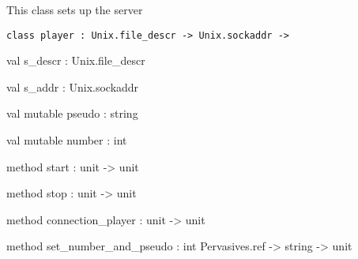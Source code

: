 \documentclass[11pt]{article}
\begin{document}
\begin{ocamldocdescription}
This class sets up the server


\end{ocamldocdescription}




\begin{ocamldoccode}
{\tt{class player : }}{\tt{Unix.file\_descr -> Unix.sockaddr -> }}\end{ocamldoccode}
\label{class:Server.player}

\begin{ocamldocobjectend}


\label{val:Server.player.s-underscoredescr}\begin{ocamldoccode}
val s_descr : Unix.file_descr
\end{ocamldoccode}


\label{val:Server.player.s-underscoreaddr}\begin{ocamldoccode}
val s_addr : Unix.sockaddr
\end{ocamldoccode}


\label{val:Server.player.pseudo}\begin{ocamldoccode}
val mutable pseudo : string
\end{ocamldoccode}


\label{val:Server.player.number}\begin{ocamldoccode}
val mutable number : int
\end{ocamldoccode}


\label{method:Server.player.start}\begin{ocamldoccode}
method start : unit -> unit
\end{ocamldoccode}


\label{method:Server.player.stop}\begin{ocamldoccode}
method stop : unit -> unit
\end{ocamldoccode}


\label{method:Server.player.connection-underscoreplayer}\begin{ocamldoccode}
method connection_player : unit -> unit
\end{ocamldoccode}


\label{method:Server.player.set-underscorenumber-underscoreand-underscorepseudo}\begin{ocamldoccode}
method set_number_and_pseudo : int Pervasives.ref -> string -> unit
\end{ocamldoccode}



\end{ocamldocobjectend}
\end{document}
